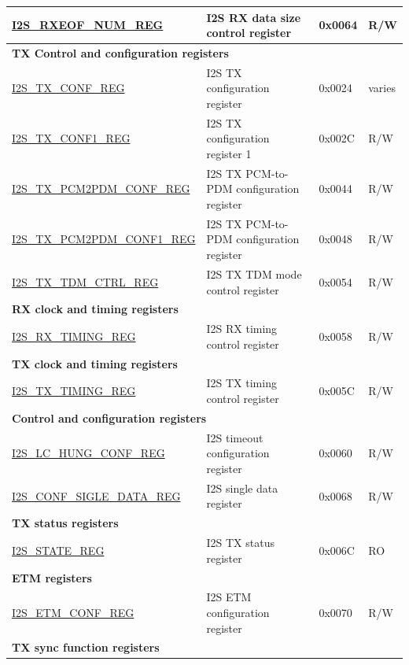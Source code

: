\begin{longtable}{ | p{6cm} | p{6.8cm} | p{1.3cm} | p{1.4cm} | }
\hyperref[regdesc:I2SRXEOFNUMREG]{I2S\_RXEOF\_NUM\_REG} & I2S RX data size control register & 0x0064 & R/W \\ \hline
\multicolumn{4}{|l|}{\textbf{TX Control and configuration registers}} \\ \hline
\hyperref[regdesc:I2STXCONFREG]{I2S\_TX\_CONF\_REG} & I2S TX configuration register & 0x0024 & varies \\ \hline
\hyperref[regdesc:I2STXCONF1REG]{I2S\_TX\_CONF1\_REG} & I2S TX configuration register 1 & 0x002C & R/W \\ \hline
\hyperref[regdesc:I2STXPCM2PDMCONFREG]{I2S\_TX\_PCM2PDM\_CONF\_REG} & I2S TX PCM-to-PDM configuration register & 0x0044 & R/W \\ \hline
\hyperref[regdesc:I2STXPCM2PDMCONF1REG]{I2S\_TX\_PCM2PDM\_CONF1\_REG} & I2S TX PCM-to-PDM configuration register & 0x0048 & R/W \\ \hline
\hyperref[regdesc:I2STXTDMCTRLREG]{I2S\_TX\_TDM\_CTRL\_REG} & I2S TX TDM mode control register & 0x0054 & R/W \\ \hline
\multicolumn{4}{|l|}{\textbf{RX clock and timing registers}} \\ \hline
\hyperref[regdesc:I2SRXTIMINGREG]{I2S\_RX\_TIMING\_REG} & I2S RX timing control register & 0x0058 & R/W \\ \hline
\multicolumn{4}{|l|}{\textbf{TX clock and timing registers}} \\ \hline
\hyperref[regdesc:I2STXTIMINGREG]{I2S\_TX\_TIMING\_REG} & I2S TX timing control register & 0x005C & R/W \\ \hline
\multicolumn{4}{|l|}{\textbf{Control and configuration registers}} \\ \hline
\hyperref[regdesc:I2SLCHUNGCONFREG]{I2S\_LC\_HUNG\_CONF\_REG} & I2S timeout configuration register & 0x0060 & R/W \\ \hline
\hyperref[regdesc:I2SCONFSIGLEDATAREG]{I2S\_CONF\_SIGLE\_DATA\_REG} & I2S single data register & 0x0068 & R/W \\ \hline
\multicolumn{4}{|l|}{\textbf{TX status registers}} \\ \hline
\hyperref[regdesc:I2SSTATEREG]{I2S\_STATE\_REG} & I2S TX status register & 0x006C & RO \\ \hline
\multicolumn{4}{|l|}{\textbf{ETM registers}} \\ \hline
\hyperref[regdesc:I2SETMCONFREG]{I2S\_ETM\_CONF\_REG} & I2S ETM configuration register & 0x0070 & R/W \\ \hline
\multicolumn{4}{|l|}{\textbf{TX sync function registers}} \\ \hline

\end{longtable}
